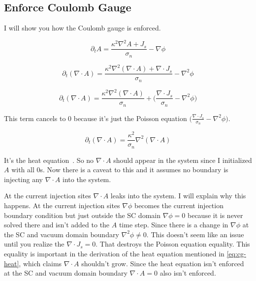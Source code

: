 \documentclass[11pt]{article}
\theoremstyle{definition}
\begin{document}
\subsection{Enforce Coulomb Gauge}
\label{sec:coulomb-gauge}

I will show you how the Coulomb gauge is enforced.

\begin{equation}
\label{eq:cg-1}
\partial_t A = \frac{\kappa^2 \nabla^2 A + J_s}{\sigma_n} - \nabla \phi
\end{equation}

\begin{equation}
\label{eq:cg-2}
\partial_t (\nabla \cdot A) = \frac{\kappa^2 \nabla^2 (\nabla \cdot A) + \nabla \cdot J_s}{\sigma_n} - \nabla^2 \phi
\end{equation}

\begin{equation}
\label{eq:cg-3}
\partial_t (\nabla \cdot A) = \frac{\kappa^2 \nabla^2 (\nabla \cdot A)}{\sigma_n} + \big( \frac{\nabla \cdot J_s}{\sigma_n} - \nabla^2 \phi \big)
\end{equation}

This term cancels to 0 because it's just the Poisson equation $\big( \frac{\nabla \cdot J_s}{\sigma_n} - \nabla^2 \phi \big)$.

\begin{equation}
\label{eq:cg-heat}
\partial_t (\nabla \cdot A) = \frac{\kappa^2}{\sigma_n} \nabla^2 (\nabla \cdot A)
\end{equation}

It's the heat equation~\cite{tain2024}. So no $\nabla \cdot A$ should appear in the system since I initialized $A$ with all 0s. Now there is a caveat to this and it assumes no boundary is injecting any $\nabla \cdot A$ into the system. 

At the current injection sites $\nabla \cdot A$ leaks into the system. I will explain why this happens. At the current injection sites $\nabla \phi$ becomes the current injection boundary condition but just outside the SC domain $\nabla \phi = 0$ because it is never solved there and isn't added to the $A$ time step. Since there is a change in $\nabla \phi$ at the SC and vacuum domain boundary $\nabla^2 \phi \neq 0$. This doesn't seem like an issue until you realize the $\nabla \cdot J_s = 0$. That destroys the Poisson equation equality. This equality is important in the derivation of the heat equation mentioned in \cref{eq:cg-heat}, which claims $\nabla \cdot A$ shouldn't grow. Since the heat equation isn't enforced at the SC and vacuum domain boundary $\nabla \cdot A = 0$ also isn't enforced.
\end{document}
